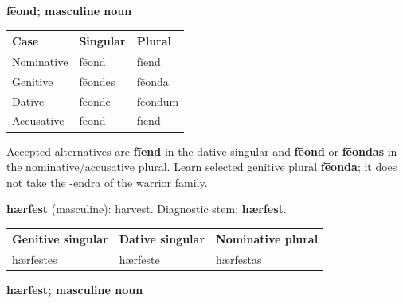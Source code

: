 \textbf{fēond; masculine noun}

\par\begingroup
\fontsize{10.5}{13.2}\selectfont
\setlength{\LTleft}{0pt}\setlength{\LTright}{\fill}
\noindent
\begin{tabular}{@{}>{\raggedright\arraybackslash}p{39.46mm}>{\raggedright\arraybackslash}p{39.46mm}>{\raggedright\arraybackslash}p{39.46mm}@{}}
\toprule
\textbf{Case} & \textbf{Singular} & \textbf{Plural} \\
\midrule
Nominative & fēond & fīend \\
Genitive & fēondes & fēonda \\
Dative & fēonde & fēondum \\
Accusative & fēond & fīend \\
\bottomrule
\end{tabular}
\par\endgroup

Accepted alternatives are \textbf{fīend} in the dative singular and \textbf{fēond} or \textbf{fēondas} in the nominative/\allowbreak{}accusative plural. Learn selected genitive plural \textbf{fēonda}; it does not take the -endra of the warrior family.

\textbf{hærfest} (masculine): harvest. Diagnostic stem: \textbf{hærfest}.

\par\begingroup
\fontsize{10.5}{13.2}\selectfont
\setlength{\LTleft}{0pt}\setlength{\LTright}{\fill}
\noindent
\begin{tabular}{@{}>{\raggedright\arraybackslash}p{40.42mm}>{\raggedright\arraybackslash}p{35.77mm}>{\raggedright\arraybackslash}p{42.19mm}@{}}
\toprule
\textbf{Genitive singular} & \textbf{Dative singular} & \textbf{Nominative plural} \\
\midrule
hærfestes & hærfeste & hærfestas \\
\bottomrule
\end{tabular}
\par\endgroup

\textbf{hærfest; masculine noun}

